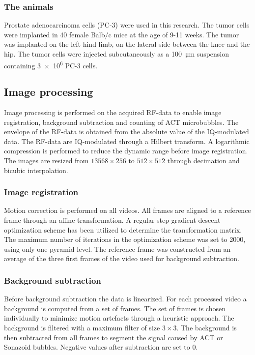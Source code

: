 \subsubsection{The animals}
Prostate adenocarcinoma cells (PC-3) were used in this research. The tumor cells were implanted in 40 female Balb/c mice at the age of 9-11 weeks. The tumor was implanted on the left hind limb, on the lateral side between the knee and the hip. The tumor cells were injected subcutaneously as a \SI{100}{\micro\meter} suspension containing \num{3e6} PC-3 cells.

\subsection{Image processing}
Image processing is performed on the acquired RF-data to enable image registration, background subtraction and counting of ACT\texttrademark{} microbubbles. The envelope of the RF-data is obtained from the absolute value of the IQ-modulated data. The RF-data are IQ-modulated through a Hilbert transform. A logarithmic compression is performed to reduce the dynamic range before image registration. The images are resized from $13568\times 256$ to $512\times 512$ through decimation and bicubic interpolation.  

\subsubsection{Image registration}
Motion correction is performed on all videos. All frames are aligned to a reference frame through an affine transformation. A regular step gradient descent optimization scheme has been utilized to determine the transformation matrix. The maximum number of iterations in the optimization scheme was set to 2000, using only one pyramid level. The reference frame was constructed from an average of the three first frames of the video used for background subtraction.

\subsubsection{Background subtraction}
Before background subtraction the data is linearized. For each processed video a background is computed from a set of frames. The set of frames is chosen individually to minimize motion artefacts through a heuristic approach. The background is filtered with a maximum filter of size $3\times 3$. The background is then subtracted from all frames to segment the signal caused by ACT\texttrademark{} or Sonazoid\texttrademark{} bubbles. Negative values after subtraction are set to 0. 

